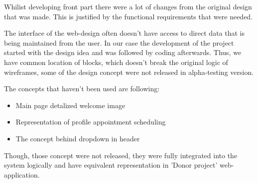 Whilist developing front part there were a lot of changes from the original design that was made. This is justified by the functional requirements that were needed. 
\par
The interface of the web-design often doesn't have access to direct data that is being maintained from the user. In our case the development of the project started with the design idea and was followed by coding afterwards. Thus, we have common location of blocks, which doesn't break the original logic of wireframes, some of the design concept were not released in alpha-testing version.
\par
The concepts that haven't been used are following:
\begin{itemize}
  \item Main page detalized welcome image
  \item Representation of profile appointment scheduling
  \item The concept behind dropdown in header
\end{itemize}
\par
Though, those concept were not released, they were fully integrated into the system logically and have equivalent representation in 'Donor project' web-application.